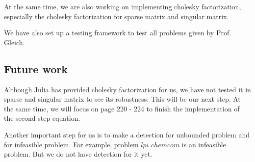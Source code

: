 At the same time, we are also working on implementing cholesky factorization, especially the cholesky factorization for sparse matrix and singular matrix. 

We have also set up a testing framework to test all problems given by Prof. Gleich. 

\subsection{Future work}\label{section:future}
Although Julia has provided cholesky factorization for us, we have not tested it in sparse and singular matrix to see its robustness. This will be our next step. At the same time, we will focus on page 220 - 224 to finish the implementation of the second step equation. 

Another important step for us is to make a detection for unbounded problem and for infeasible problem. For example, problem $lpi\_chemcom$ is an infeasible problem. But we do not have detection for it yet. 